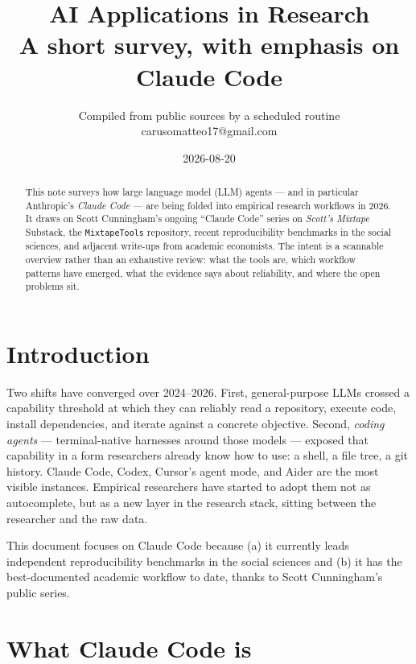 \documentclass[11pt,a4paper]{article}
\title{AI Applications in Research \\
\large A short survey, with emphasis on Claude Code}
\author{Compiled from public sources by a scheduled routine \\
        \small carusomatteo17@gmail.com}
\date{2026-08-20}
\begin{document}
\maketitle

\begin{abstract}
This note surveys how large language model (LLM) agents --- and in
particular Anthropic's \emph{Claude Code} --- are being folded into
empirical research workflows in 2026. It draws on Scott Cunningham's
ongoing ``Claude Code'' series on \emph{Scott's Mixtape} Substack, the
\texttt{MixtapeTools} repository, recent reproducibility benchmarks in
the social sciences, and adjacent write-ups from academic economists.
The intent is a scannable overview rather than an exhaustive review:
what the tools are, which workflow patterns have emerged, what the
evidence says about reliability, and where the open problems sit.
\end{abstract}

\tableofcontents

\section{Introduction}

Two shifts have converged over 2024--2026. First, general-purpose LLMs
crossed a capability threshold at which they can reliably read a
repository, execute code, install dependencies, and iterate against a
concrete objective. Second, \emph{coding agents} --- terminal-native
harnesses around those models --- exposed that capability in a form
researchers already know how to use: a shell, a file tree, a git
history. Claude Code, Codex, Cursor's agent mode, and Aider are the
most visible instances. Empirical researchers have started to adopt
them not as autocomplete, but as a new layer in the research stack,
sitting between the researcher and the raw data.

This document focuses on Claude Code because (a) it currently leads
independent reproducibility benchmarks in the social sciences and
(b) it has the best-documented academic workflow to date, thanks to
Scott Cunningham's public series.

\section{What Claude Code is}
\end{document}
